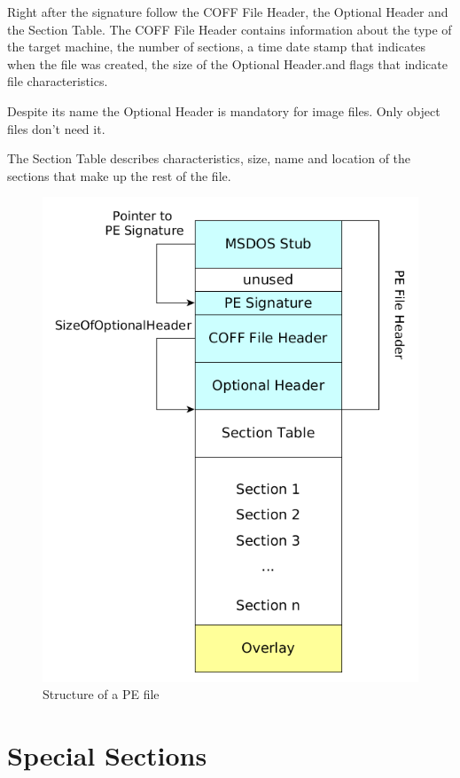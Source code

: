 Right after the signature follow the COFF File Header, the Optional Header and the Section Table. The COFF File Header contains information about the type of the target machine, the number of sections, a time date stamp that indicates when the file was created, the size of the Optional Header.and flags that indicate file characteristics.

Despite its name the Optional Header is mandatory for image files. Only object files don't need it.

The Section Table describes \ia{} characteristics, size, name and location of the sections that make up the rest of the \PE{} file.

\begin{figure}
\includegraphics[width=.98\textwidth, height=\textheight,keepaspectratio]{graphics/peformat}
\caption{Structure of a PE file }
\label{fig:peformat} 
\end{figure}

\section{Special Sections}

